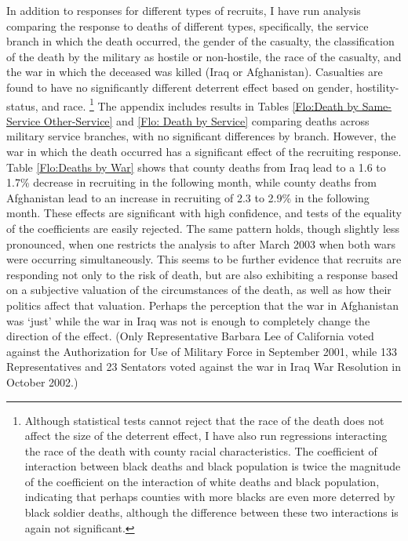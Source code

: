 \documentclass[12pt] {article}
\begin{document}
In addition to responses for different types of recruits, I have run analysis comparing the response to deaths of different types, specifically, the service branch in which the death occurred, the gender of the casualty, the classification of the death by the military as hostile or non-hostile, the race of
the casualty, and the war in which the deceased was killed (Iraq or
Afghanistan). Casualties are found to have no significantly different
deterrent effect based on gender, hostility-status, and race.%
\footnote{Although statistical tests cannot reject that the race of the death
does not affect the size of the deterrent effect, I have also run
regressions interacting the race of the death with county racial characteristics.
The coefficient of interaction between black deaths and black population
is twice the magnitude of the coefficient on the interaction of white
deaths and black population, indicating that perhaps counties with
more blacks are even more deterred by black soldier deaths, although
the difference between these two interactions is again not significant.%
} The appendix includes results in Tables \ref{Flo:Death by Same-Service Other-Service} and \ref{Flo: Death by Service} comparing deaths across military service branches, with no significant differences by branch. However, the war in which the death occurred has a significant effect of the recruiting response. Table \ref{Flo:Deaths by War} shows that
county deaths from Iraq lead to a 1.6 to 1.7\% decrease in recruiting
in the following month, while county deaths from Afghanistan lead
to an increase in recruiting of 2.3 to 2.9\% in the following month. 
These effects are significant with high confidence, and tests of the
equality of the coefficients are easily rejected. The same pattern holds, though slightly less pronounced, when one restricts the analysis to after March 2003 when both wars were occurring simultaneously. This seems to be further evidence that recruits are responding not only to the risk of death, but are also exhibiting a response based on a subjective valuation of the circumstances of the death, as well as how their politics affect that valuation. Perhaps the perception that the war in Afghanistan was `just' while the war in Iraq was not is enough to completely change the direction of the effect. (Only Representative Barbara Lee of California voted against the Authorization for Use of Military Force in September 2001, while 133 Representatives and 23 Sentators voted against the war in Iraq War Resolution in October 2002.)
\end{document}
